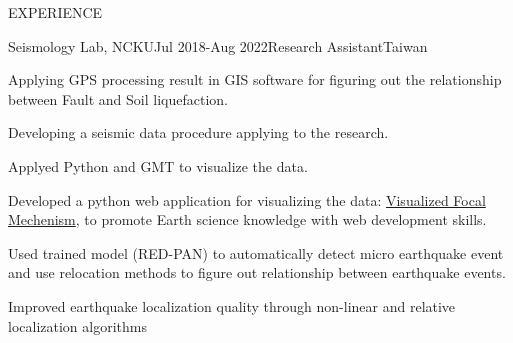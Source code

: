 \documentclass{resume} %
\begin{document}
\begin{rSection}{EXPERIENCE}


\begin{rSubsection}{Seismology Lab, NCKU}{Jul 2018-Aug 2022}{Research Assistant}{Taiwan}
\item Applying GPS processing result in GIS software for figuring out the relationship between Fault and Soil liquefaction.
\item Developing a seismic data procedure applying to the research.
\item Applyed Python and GMT to visualize the data.
\item Developed a python web application for visualizing the data: \href{https://beachball.clam.moe}{Visualized Focal Mechenism}, to promote Earth science knowledge with web development skills.
\item Used trained model (RED-PAN) to automatically detect micro earthquake event and use relocation methods to figure out relationship between earthquake events.
\item Improved earthquake localization quality through non-linear and relative localization algorithms
\end{rSubsection}



\end{rSection}
\end{document}
